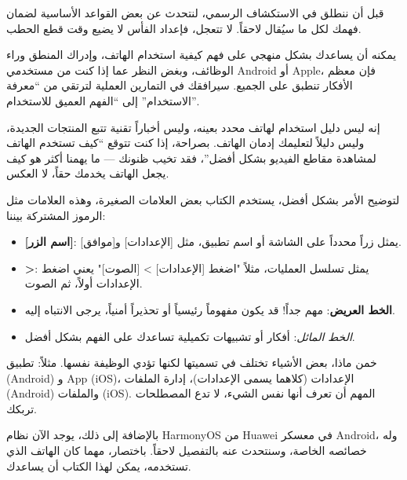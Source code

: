 
قبل أن ننطلق في الاستكشاف الرسمي، لنتحدث عن بعض القواعد الأساسية لضمان فهمك لكل ما سيُقال لاحقاً. لا تتعجل، فإعداد الفأس لا يضيع وقت قطع الحطب.


يمكنه أن يساعدك بشكل منهجي على فهم كيفية استخدام الهاتف، وإدراك المنطق وراء الوظائف، وبغض النظر عما إذا كنت من مستخدمي Android أو Apple، فإن معظم الأفكار تنطبق على الجميع. سيرافقك في التمارين العملية لترتقي من “معرفة الاستخدام” إلى “الفهم العميق للاستخدام”.

إنه ليس دليل استخدام لهاتف محدد بعينه، وليس أخباراً تقنية تتبع المنتجات الجديدة، وليس دليلاً لتعليمك إدمان الهاتف. بصراحة، إذا كنت تتوقع “كيف تستخدم الهاتف لمشاهدة مقاطع الفيديو بشكل أفضل”، فقد تخيب ظنونك — ما يهمنا أكثر هو كيف يجعل الهاتف يخدمك حقاً، لا العكس.


لتوضيح الأمر بشكل أفضل، يستخدم الكتاب بعض العلامات الصغيرة، وهذه العلامات مثل الرموز المشتركة بيننا:

\begin{itemize}
  \item \textbf{[اسم الزر]}: يمثل زراً محدداً على الشاشة أو اسم تطبيق، مثل [الإعدادات] و[موافق].
  \item \textbf{>}: يمثل تسلسل العمليات، مثلاً "اضغط [الإعدادات] > [الصوت]" يعني اضغط الإعدادات أولاً، ثم الصوت.
  \item \textbf{الخط العريض}: مهم جداً! قد يكون مفهوماً رئيسياً أو تحذيراً أمنياً، يرجى الانتباه إليه.
  \item \emph{الخط المائل}: أفكار أو تشبيهات تكميلية تساعدك على الفهم بشكل أفضل.
\end{itemize}


خمن ماذا، بعض الأشياء تختلف في تسميتها لكنها تؤدي الوظيفة نفسها. مثلاً: تطبيق (Android) و App (iOS)، الإعدادات (كلاهما يسمى الإعدادات)، إدارة الملفات (Android) والملفات (iOS). المهم أن تعرف أنها نفس الشيء، لا تدع المصطلحات تربكك.

بالإضافة إلى ذلك، يوجد الآن نظام HarmonyOS من Huawei في معسكر Android، وله خصائصه الخاصة، وسنتحدث عنه بالتفصيل لاحقاً. باختصار، مهما كان الهاتف الذي تستخدمه، يمكن لهذا الكتاب أن يساعدك.


